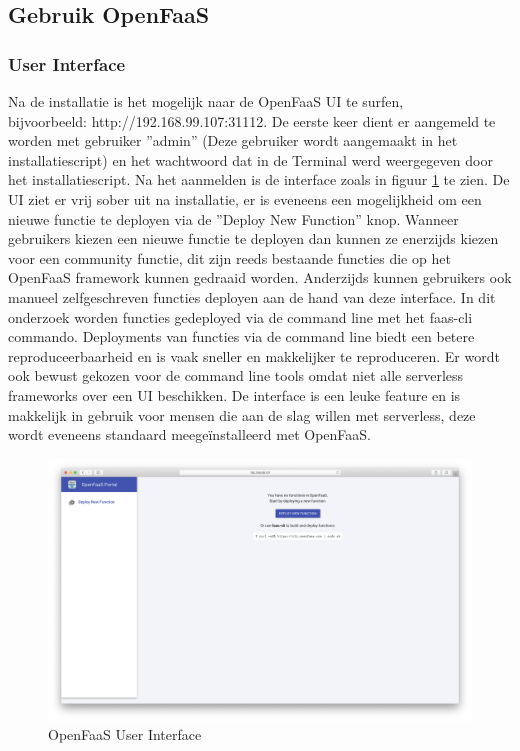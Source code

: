 \subsection{Gebruik OpenFaaS}
\subsubsection{User Interface}
Na de installatie is het mogelijk naar de OpenFaaS UI te surfen, \\bijvoorbeeld: http://192.168.99.107:31112. 
De eerste keer dient er aangemeld te worden met gebruiker ''admin'' (Deze gebruiker wordt aangemaakt in het installatiescript) en het wachtwoord dat in de Terminal werd weergegeven door het installatiescript. Na het aanmelden is de interface zoals in figuur \ref{fig:openfaas-ui} te zien. De UI ziet er vrij sober uit na installatie, er is eveneens een mogelijkheid om een nieuwe functie te deployen via de ''Deploy New Function'' knop. Wanneer gebruikers kiezen een nieuwe functie te deployen dan kunnen ze enerzijds kiezen voor een community functie, dit zijn reeds bestaande functies die op het OpenFaaS framework kunnen gedraaid worden. Anderzijds kunnen gebruikers ook manueel zelfgeschreven functies deployen aan de hand van deze interface. In dit onderzoek worden functies gedeployed via de command line met het faas-cli commando. Deployments van functies via de command line biedt een betere reproduceerbaarheid en is vaak sneller en makkelijker te reproduceren. Er wordt ook bewust gekozen voor de command line tools omdat niet alle serverless frameworks over een UI beschikken. De interface is een leuke feature en is makkelijk in gebruik voor mensen die aan de slag willen met serverless, deze wordt eveneens standaard meegeïnstalleerd met OpenFaaS.
\begin{figure}
    \includegraphics[width=1\textwidth]{img/openfaas-ui.png}
    \caption{OpenFaaS User Interface}
    \label{fig:openfaas-ui}  
\end{figure}

